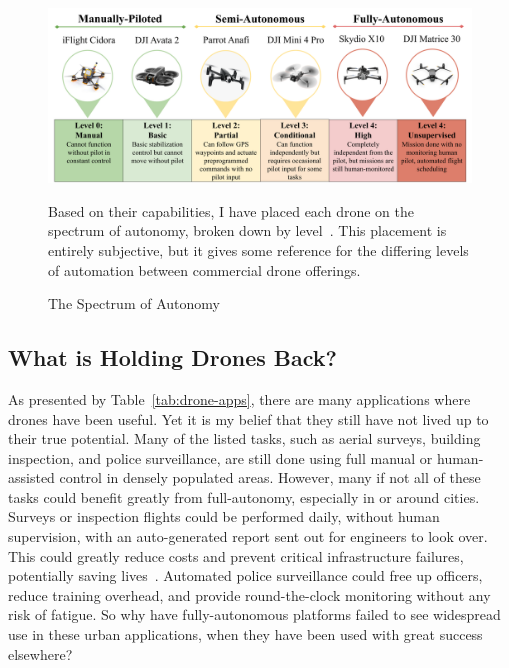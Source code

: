 \begin{figure}[]
    \\[0.6cm]
    \centering
    \includegraphics[width=1.0\linewidth]{chapter2/FIGS/spectrum.png}
    \begin{captext}
        \small Based on their capabilities, I have placed each drone on the spectrum of autonomy, broken down by level~\cite{Cloudfactory}. This placement is entirely subjective, but it gives some reference for the differing levels of automation between commercial drone offerings.
    \end{captext}
    \caption{The Spectrum of Autonomy~\cite{Cidora,DJIAvata2,ParrotAnafi,DJIMini4,SkydioX10,Matrice30T}}
    \label{fig:spectrum}
\end{figure}

\subsection{What is Holding Drones Back?}
\label{sec:problems}
As presented by Table~\ref{tab:drone-apps}, there are many applications where drones have been useful. Yet it is my belief that they still have not lived up to their true potential. Many of the listed tasks, such as aerial surveys, building inspection, and police surveillance, are still done using full manual or human-assisted control in densely populated areas. However, many if not all of these tasks could benefit greatly from full-autonomy, especially in or around cities. Surveys or inspection flights could be performed daily, without human supervision, with an auto-generated report sent out for engineers to look over. This could greatly reduce costs and prevent critical infrastructure failures, potentially saving lives~\cite{Dorafshan2018}. Automated police surveillance could free up officers, reduce training overhead, and provide round-the-clock monitoring without any risk of fatigue. So why have fully-autonomous platforms failed to see widespread use in these urban applications, when they have been used with great success elsewhere?


